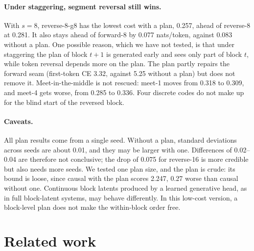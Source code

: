 \documentclass[11pt]{article}
\theoremstyle{definition}
\theoremstyle{remark}
\newcommand{\sch}[1]{\textsf{#1}}
\begin{document}
\paragraph{Under staggering, segment reversal still wins.}
With $s=8$, \sch{reverse-8-g8} has the lowest cost with a plan, 0.257, ahead of \sch{reverse-8} at 0.281.
It also stays ahead of \sch{forward-8} by 0.077 nats/token, against 0.083 without a plan.
One possible reason, which we have not tested, is that under staggering the plan of block $t+1$ is generated early and sees only part of block $t$, while token reversal depends more on the plan.
The plan partly repairs the forward seam (first-token CE 3.32, against 5.25 without a plan) but does not remove it.
Meet-in-the-middle is not rescued: \sch{meet-1} moves from 0.318 to 0.309, and \sch{meet-4} gets worse, from 0.285 to 0.336.
Four discrete codes do not make up for the blind start of the reversed block.

\paragraph{Caveats.}
All plan results come from a single seed.
Without a plan, standard deviations across seeds are about 0.01, and they may be larger with one.
Differences of 0.02--0.04 are therefore not conclusive; the drop of 0.075 for \sch{reverse-16} is more credible but also needs more seeds.
We tested one plan size, and the plan is crude: its bound is loose, since \sch{causal} with the plan scores 2.247, 0.27 worse than \sch{causal} without one.
Continuous block latents produced by a learned generative head, as in full block-latent systems, may behave differently.
In this low-cost version, a block-level plan does not make the within-block order free.

\section{Related work}
\label{sec:related}
\end{document}
